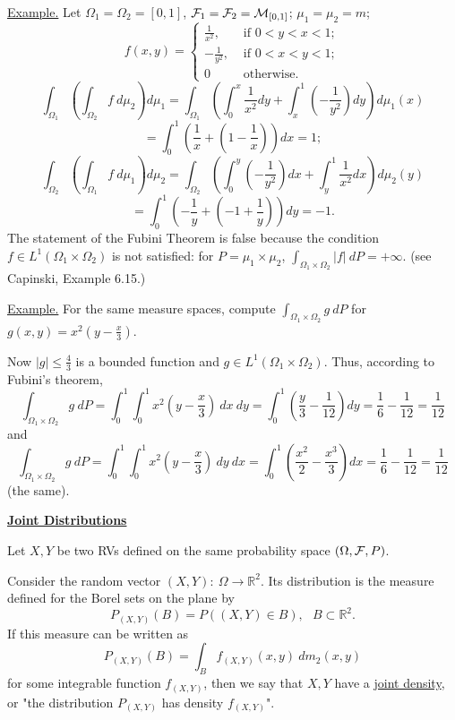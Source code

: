 \documentclass[a4paper,10pt]{article}
\def\RR{\mathbb{R}}
\newcommand{\1}[1]{\mathbf{1}_{\{#1\}}}
\begin{document}
\underline{Example.} Let $\Omega_1=\Omega_2=[0,1]$, ${\cal F}_1={\cal F}_2={\cal M}_{[0,1]}$; $\mu_1=\mu_2=m$;
  $$f(x,y)=\left\{\begin{array}{ll} \frac{1}{x^2}, & \mbox{ if } 0<y<x<1; \\  -\frac{1}{y^2}, & \mbox{ if } 0<x<y<1; \\ 0 & \mbox{ otherwise}. \end{array} \right. $$
  $$\int_{\Omega_1}\left(\int_{\Omega_2} f~d\mu_2\right) d\mu_1=\int_{\Omega_1}\left(\int_0^x \frac{1}{x^2} dy+\int_x^1 \left(-\frac{1}{y^2}\right) dy\right) d\mu_1(x)$$
  $$=\int_0^1\left(\frac{1}{x}+(1-\frac{1}{x})\right) dx=1;$$
  $$\int_{\Omega_2}\left(\int_{\Omega_1} f~d\mu_1\right) d\mu_2=\int_{\Omega_2}\left(\int_0^y\left(-\frac{1}{y^2}\right) dx+\int_y^1 \frac{1}{x^2} dx\right) d\mu_2(y)$$
  $$=\int_0^1\left(-\frac{1}{y}+(-1+\frac{1}{y})\right) dy=-1.$$
The statement of the Fubini Theorem is false because the condition $f\in L^1(\Omega_1\times\Omega_2)$ is not satisfied: for $P=\mu_1\times\mu_2$, $\displaystyle \int_{\Omega_1\times\Omega_2}|f|~dP=+\infty$. (see Capinski, Example 6.15.)\vspace{3mm}

\underline{Example.} For the same measure spaces, compute $\int_{\Omega_1\times\Omega_2} g~dP$ for $g(x,y)=x^2(y-\frac{x}{3})$.

Now $|g|\le \frac{4}{3}$ is a bounded function and $g\in L^1(\Omega_1\times\Omega_2)$. Thus, according to Fubini's theorem,
  $$\int_{\Omega_1\times\Omega_2} g~dP=\int_0^1\int_0^1 x^2(y-\frac{x}{3}) ~dx~dy=\int_0^1\left(\frac{y}{3}-\frac{1}{12}\right) dy=\frac{1}{6}-\frac{1}{12}=\frac{1}{12}$$
and
  $$\int_{\Omega_1\times\Omega_2} g~dP=\int_0^1\int_0^1 x^2(y-\frac{x}{3}) ~dy~dx=\int_0^1\left(\frac{x^2}{2}-\frac{x^3}{3}\right) dx=\frac{1}{6}-\frac{1}{12}=\frac{1}{12}$$
(the same). \vspace{3mm}

\begin{center}\bf\underline{Joint Distributions} \end{center}\vspace{3mm}

Let $X,Y$ be two RVs defined on the same probability space $(\Omega,{\cal F},P)$.

Consider the random vector $(X,Y):~\Omega\to \RR^2$. Its distribution is the measure defined for the Borel sets on the plane by
  $$P_{(X,Y)}(B)=P((X,Y)\in B),~~~B\subset\RR^2.$$
If this measure can be written as
  $$P_{(X,Y)}(B)=\int_B f_{(X,Y)}(x,y)~dm_2(x,y)$$
for some integrable function $f_{(X,Y)}$, then we say that $X,Y$ have a \linebreak \underline{joint density}, or "the distribution $P_{(X,Y)}$ has density $f_{(X,Y)}$".
\vspace{3mm}
\end{document}
